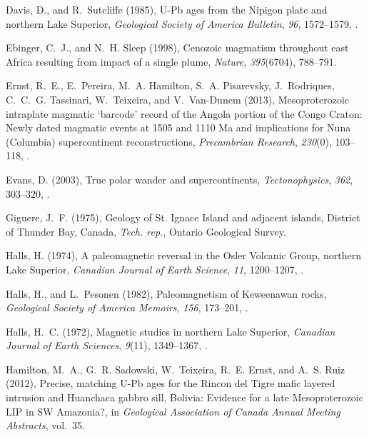 \documentclass[draft,gc]{AGUTeX}
\begin{document}
\begin{article}
\begin{thebibliography}{24}
Davis, D., and R.~Sutcliffe (1985), {U}-{P}b ages from the {N}ipigon plate and
  northern {L}ake {S}uperior, \textit{Geological Society of America Bulletin},
  \textit{96}, 1572--1579,
  .
  
Ebinger, C.~J., and N.~H. Sleep (1998), Cenozoic magmatism throughout east
  Africa resulting from impact of a single plume, \textit{Nature},
  \textit{395}(6704), 788--791.

Ernst, R.~E., E.~Pereira, M.~A. Hamilton, S.~A. Pisarevsky, J.~Rodriques,
  C.~C.~G. Tassinari, W.~Teixeira, and V.~Van-Dunem (2013), {Mesoproterozoic
  intraplate magmatic `barcode' record of the Angola portion of the Congo
  Craton: Newly dated magmatic events at 1505 and 1110 Ma and implications for
  Nuna (Columbia) supercontinent reconstructions}, \textit{Precambrian
  Research}, \textit{230}(0), 103--118, .

Evans, D. (2003), True polar wander and supercontinents,
  \textit{Tectonophysics}, \textit{362}, 303--320,
  .

Giguere, J.~F. (1975), {Geology of St. Ignace Island and adjacent islands,
  District of Thunder Bay, Canada}, \textit{Tech. rep.}, Ontario Geological
  Survey.

Halls, H. (1974), A paleomagnetic reversal in the {O}sler {V}olcanic {G}roup,
  northern {L}ake {S}uperior, \textit{Canadian Journal of Earth Science},
  \textit{11}, 1200--1207, .

Halls, H., and L.~Pesonen (1982), Paleomagnetism of {K}eweenawan rocks,
  \textit{Geological Society of America Memoirs}, \textit{156}, 173--201,
  .

Halls, H.~C. (1972), Magnetic studies in northern {L}ake {S}uperior,
  \textit{Canadian Journal of Earth Sciences}, \textit{9}(11), 1349--1367,
  .

Hamilton, M.~A., G.~R. Sadowski, W.~Teixeira, R.~E. Ernst, and A.~S. Ruiz
  (2012), {Precise, matching U-Pb ages for the Rincon del Tigre mafic layered
  intrusion and Huanchaca gabbro sill, Bolivia: Evidence for a late
  Mesoproterozoic LIP in SW Amazonia?}, in \textit{Geological Association of
  Canada Annual Meeting Abstracts}, vol.~35.


\end{thebibliography}
\end{article}
\end{document}
